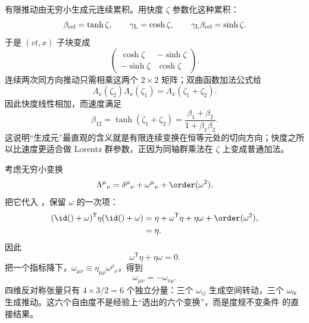 \begin{exbox}[沿 $x$ 轴的有限推动]
有限推动由无穷小生成元连续累积。用快度 $\zeta$ 参数化这种累积：
\begin{equation}
 \beta_{\rm rel}=\tanh\zeta,
 \qquad
 \gamma_{\rm L}=\cosh\zeta,
 \qquad
 \gamma_{\rm L}\beta_{\rm rel}=\sinh\zeta.
 \label{eq:rapidity-definition-dp61}
\end{equation}
于是 $(ct,x)$ 子块变成
\begin{equation*}
 \begin{pmatrix}\cosh\zeta&-\sinh\zeta\\-\sinh\zeta&\cosh\zeta\end{pmatrix}.
\end{equation*}
连续两次同方向推动只需相乘这两个 $2\times2$ 矩阵；双曲函数加法公式给
\begin{equation*}
 \Lambda_x(\zeta_2)\Lambda_x(\zeta_1)
 =\Lambda_x(\zeta_1+\zeta_2).
\end{equation*}
因此快度线性相加，而速度满足
\begin{equation}
 {
 \beta_{12}
 =\tanh(\zeta_1+\zeta_2)
 =\frac{\beta_1+\beta_2}{1+\beta_1\beta_2}.}
 \label{eq:velocity-addition-dp61}
\end{equation}
这说明“生成元”最直观的含义就是有限连续变换在恒等元处的切向方向；快度之所以比速度更适合做 Lorentz 群参数，正因为同轴群乘法在 $\zeta$ 上变成普通加法。
\end{exbox}

考虑无穷小变换
\begin{equation*}
 \Lambda^\mu{}_{\nu}=\delta^\mu{}_{\nu}+\omega^\mu{}_{\nu}+\order(\omega^2).
\end{equation*}
把它代入 ，保留 $\omega$ 的一次项：
\begin{align*}
 (\id()+\omega)^{\mathsf T}\eta(\id()+\omega)
 &=\eta+\omega^{\mathsf T}\eta+\eta\omega+\order(\omega^2),\\
 &=\eta.
\end{align*}
因此
\begin{equation*}
 \omega^{\mathsf T}\eta+\eta\omega=0.
\end{equation*}
把一个指标降下，$\omega_{\mu\nu}\equiv\eta_{\mu\rho}\omega^\rho{}_{\nu}$，得到
\begin{equation}
 \omega_{\mu\nu}=-\omega_{\nu\mu}.
 \label{eq:omega-antisym}
\end{equation}
四维反对称张量只有 $4\times3/2=6$ 个独立分量：三个 $\omega_{ij}$ 生成空间转动，三个 $\omega_{0i}$ 生成推动。这六个自由度不是经验上“选出的六个变换”，而是度规不变条件  的直接结果。

